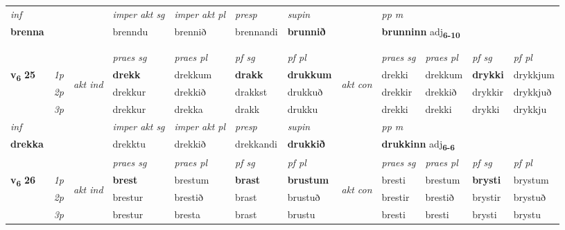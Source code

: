 \begin{longtable}[l]{X>{\footnotesize\itshape}llXXXXlXXXX}
   {\textit{inf}} & &  & \textit{imper akt sg} & \textit{imper akt pl}   & \textit{presp} & \textit{supin}  && \textit{pp m} \\*
  {\textbf{brenna}} & && brenndu  & brennið   & brennandi &  \textbf{brunnið}  && \multicolumn{2}{l}{\textbf{brunninn} adj\textbf{\textsubscript{6-10}}} \\*

\midrule
  & \\*
  & \\
   \midrule
 & &   & \textit{praes sg}  & \textit{praes pl}    & \textit{ pf sg} & \textit{pf pl} & & \textit{praes sg}  & \textit{praes pl}    & \textit{pf sg} & \textit{pf pl }  \\ \cmidrule{4-7} \cmidrule{9-12}
 \multirow{2}{*}{{{\textbf{v{\textsubscript{6}}} \Large{\textbf{25}}}}}  & 1p & \multirow{3}{*}{\begin{turn}{90}\textit{akt ind}\end{turn}} & \textbf{drekk} & drekkum & \textbf{drakk} & \textbf{drukkum} & \multirow{3}{*}{\begin{turn}{90}\textit{akt con}\end{turn}} &drekki & drekkum & \textbf{drykki} & drykkjum\\*
 & 2p &  &  drekkur  & drekkið & drakkst & drukkuð & & drekkir & drekkið & drykkir & drykkjuð \\*
 & 3p &  & drekkur & drekka & drakk & drukku & & drekki & drekki& drykki & drykkju \\*
\cmidrule{4-7} \cmidrule{9-12}

   {\textit{inf}} & &  & \textit{imper akt sg} & \textit{imper akt pl}   & \textit{presp} & \textit{supin}  && \textit{pp m} \\*
  {\textbf{drekka}} & && drekktu  & drekkið   & drekkandi &  \textbf{drukkið}  && \multicolumn{2}{l}{\textbf{drukkinn} adj\textbf{\textsubscript{6-6}}} \\*

\midrule

 & &   & \textit{praes sg}  & \textit{praes pl}    & \textit{ pf sg} & \textit{pf pl} & & \textit{praes sg}  & \textit{praes pl}    & \textit{pf sg} & \textit{pf pl }  \\ \cmidrule{4-7} \cmidrule{9-12}
 \multirow{2}{*}{{{\textbf{v{\textsubscript{6}}} \Large{\textbf{26}}}}}  & 1p & \multirow{3}{*}{\begin{turn}{90}\textit{akt ind}\end{turn}} & \textbf{brest} & brestum & \textbf{brast} & \textbf{brustum} & \multirow{3}{*}{\begin{turn}{90}\textit{akt con}\end{turn}} &bresti & brestum & \textbf{brysti} & brystum\\*
 & 2p &  &  brestur  & brestið & brast & brustuð & & brestir & brestið & brystir & brystuð \\*
 & 3p &  & brestur & bresta & brast & brustu & & bresti & bresti& brysti & brystu \\*
\cmidrule{4-7} \cmidrule{9-12}


\end{longtable}
